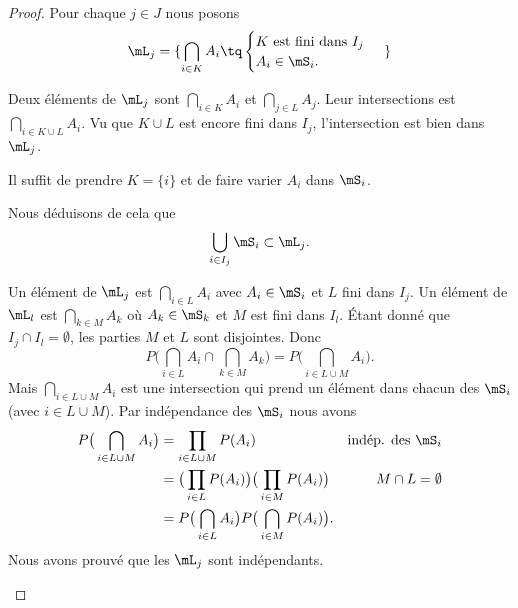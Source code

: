 \begin{proof}
	Pour chaque \( j\in J \) nous posons
	\begin{equation}
		\mL_j=\{ \bigcap_{i\in K}A_i\tq \begin{cases}
			\text{\( K\) est fini dans \( I_j\) } \\
			A_i\in \mS_i.
		\end{cases}\}
	\end{equation}

	\begin{subproof}
		Deux éléments de \( \mL_j\) sont \( \bigcap_{i\in K}A_i\) et \( \bigcap_{j\in L}A_j\). Leur intersections est \( \bigcap_{i\in K\cup L}A_i\). Vu que \( K\cup L\) est encore fini dans \( I_j\), l'intersection est bien dans \( \mL_j\).

		Il suffit de prendre \( K=\{ i \}\) et de faire varier \( A_i\) dans \( \mS_i\).


		Nous déduisons de cela que
		\begin{equation}		\label{EQooIMGTooEwmKHI}
			\bigcup_{i\in I_j}\mS_i\subset \mL_j.
		\end{equation}

		Un élément de \( \mL_j\) est \( \bigcap_{i\in L}A_i\) avec \( A_i\in \mS_i\) et \( L\) fini dans \( I_j\). Un élément de \( \mL_l\) est \( \bigcap_{k\in M}A_k\) où \( A_k\in\mS_k\) et \( M\) est fini dans \( I_l\). Étant donné que \( I_j\cap I_l=\emptyset\), les parties \( M\) et \( L\) sont disjointes. Donc
		\begin{equation}
			P\big( \bigcap_{i\in L}A_i\cap\bigcap_{k\in M}A_k \big)=P\big( \bigcap_{i\in L\cup M}A_i \big).
		\end{equation}
		Mais \( \bigcap_{i\in L\cup M}A_i\) est une intersection qui prend un élément dans chacun des \( \mS_i\) (avec \( i\in L\cup M\)). Par indépendance des \( \mS_i\) nous avons
		\begin{subequations}
			\begin{align}
				P\big( \bigcap_{i\in L\cup M}A_i \big) & =\prod_{i\in L\cup M}P(A_i)                                           & \text{indép. des \( \mS_i\)} \\
				                                       & =\big( \prod_{i\in L}P(A_i) \big)\big( \prod_{i\in M}P(A_i) \big)     & M\cap L=\emptyset            \\
				                                       & =P\big( \bigcap_{i\in L}A_i \big)P\big( \bigcap_{i\in M}P(A_i) \big).
			\end{align}
		\end{subequations}
		Nous avons prouvé que les \( \mL_j\) sont indépendants.


\end{subproof}
\end{proof}
